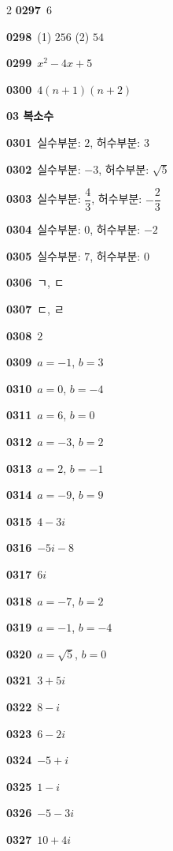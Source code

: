 \documentclass[10pt,a4paper]{article}
\begin{document}
\begin{multicols}{2}
\noindent\textbf{0297}\ $6$\par
\noindent\textbf{0298}\ (1) $256$ (2) $54$\par
\noindent\textbf{0299}\ $x^2-4x+5$\par
\noindent\textbf{0300}\ $4(n+1)(n+2)$\par
\noindent\textbf{03 복소수}\par\smallskip
\noindent\textbf{0301}\ 실수부분: $2$, 허수부분: $3$\par
\noindent\textbf{0302}\ 실수부분: $-3$, 허수부분: $\sqrt{5}$\par
\noindent\textbf{0303}\ 실수부분: $\dfrac{4}{3}$, 허수부분: $-\dfrac{2}{3}$\par
\noindent\textbf{0304}\ 실수부분: $0$, 허수부분: $-2$\par
\noindent\textbf{0305}\ 실수부분: $7$, 허수부분: $0$\par
\noindent\textbf{0306}\ ㄱ, ㄷ\par
\noindent\textbf{0307}\ ㄷ, ㄹ\par
\noindent\textbf{0308}\ $2$\par
\noindent\textbf{0309}\ $a=-1$, $b=3$\par
\noindent\textbf{0310}\ $a=0$, $b=-4$\par
\noindent\textbf{0311}\ $a=6$, $b=0$\par
\noindent\textbf{0312}\ $a=-3$, $b=2$\par
\noindent\textbf{0313}\ $a=2$, $b=-1$\par
\noindent\textbf{0314}\ $a=-9$, $b=9$\par
\noindent\textbf{0315}\ $4-3i$\par
\noindent\textbf{0316}\ $-5i-8$\par
\noindent\textbf{0317}\ $6i$\par
\noindent\textbf{0318}\ $a=-7$, $b=2$\par
\noindent\textbf{0319}\ $a=-1$, $b=-4$\par
\noindent\textbf{0320}\ $a=\sqrt{5}$, $b=0$\par
\noindent\textbf{0321}\ $3+5i$\par
\noindent\textbf{0322}\ $8-i$\par
\noindent\textbf{0323}\ $6-2i$\par
\noindent\textbf{0324}\ $-5+i$\par
\noindent\textbf{0325}\ $1-i$\par
\noindent\textbf{0326}\ $-5-3i$\par
\noindent\textbf{0327}\ $10+4i$\par

\end{multicols}
\end{document}
